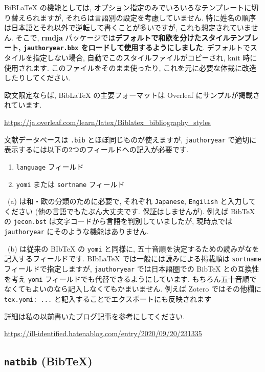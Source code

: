 \documentclass[
]{ltjsarticle}
\providecommand{\tightlist}{%
  \setlength{\itemsep}{0pt}\setlength{\parskip}{0pt}}
\begin{document}
BiBLaTeX の機能としては, オプション指定のみでいろいろなテンプレートに切り替えられますが, それらは言語別の設定を考慮していません. 特に姓名の順序は日本語とそれ以外で逆転して書くことが多いですが, これも想定されていません. そこで, \textbf{rmdja} パッケージでは\textbf{デフォルトで和欧を分けたスタイルテンプレート, \texttt{jauthoryear.bbx} をロードして使用するようにしました}. デフォルトでスタイルを指定しない場合, 自動でこのスタイルファイルがコピーされ, knit 時に使用されます. このファイルをそのまま使ったり, これを元に必要な体裁に改造したりしてください.

欧文限定ならば, BibLaTeX の主要フォーマットは Overleaf にサンプルが掲載されています.

\url{https://ja.overleaf.com/learn/latex/Biblatex_bibliography_styles}

文献データベースは \texttt{.bib} とほぼ同じものが使えますが, \texttt{jauthoryear} で適切に表示するには以下の2つのフィールドへの記入が必要です.

\begin{enumerate}
\def\labelenumi{\alph{enumi}.}
\tightlist
\item
  \texttt{language} フィールド
\item
  \texttt{yomi} または \texttt{sortname} フィールド
\end{enumerate}

~(a) は和・欧の分類のために必要で, それぞれ \texttt{Japanese}, \texttt{Engilish} と入力してください (他の言語でもたぶん大丈夫です. 保証はしませんが). 例えば BibTeX の \texttt{jecon.bst} は文字コードから言語を判別していましたが, 現時点では \texttt{jauthoryear} にそのような機能はありません.

~(b) は従来の BIbTeX の \texttt{yomi} と同様に, 五十音順を決定するための読みがなを記入するフィールドです. BIbLaTeX では一般には読みによる掲載順は \texttt{sortname} フィールドで指定しますが, \texttt{jauthoryear} では日本語圏での BibTeX との互換性を考え \texttt{yomi} フィールドでも代替できるようにしています. もちろん五十音順でなくてもよいのなら記入しなくてもかまいません. 例えば Zotero ではその他欄に \texttt{tex.yomi:\ ...} と記入することでエクスポートにも反映されます

詳細は私の以前書いたブログ記事を参考にしてください.

\url{https://ill-identified.hatenablog.com/entry/2020/09/20/231335}

\hypertarget{natbib-bibtex}{%
\subsection{\texorpdfstring{\texttt{natbib} (BibTeX)}{natbib (BibTeX)}}\label{natbib-bibtex}}
\end{document}
